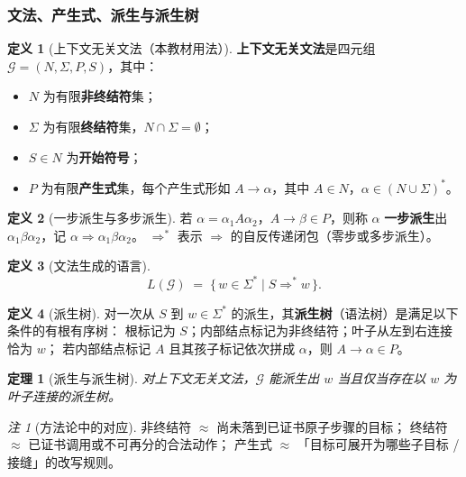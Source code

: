 \documentclass[UTF8,a4paper,11pt]{ctexart}
\theoremstyle{definition}
\newtheorem{definition}{定义}[section]
\theoremstyle{plain}
\newtheorem{theorem}{定理}[section]
\theoremstyle{remark}
\newtheorem{remark}{注}[section]
\numberwithin{figure}{section}
\numberwithin{table}{section}
\begin{document}
\subsubsection{文法、产生式、派生与派生树}
\label{sec:grammar}

\begin{definition}[上下文无关文法（本教材用法）]
\textbf{上下文无关文法}是四元组 $\mathcal{G}=(N,\Sigma,P,S)$，其中：
\begin{itemize}
  \item $N$ 为有限\textbf{非终结符}集；
  \item $\Sigma$ 为有限\textbf{终结符}集，$N\cap\Sigma=\emptyset$；
  \item $S\in N$ 为\textbf{开始符号}；
  \item $P$ 为有限\textbf{产生式}集，每个产生式形如 $A\to\alpha$，其中 $A\in N$，$\alpha\in(N\cup\Sigma)^*$。
\end{itemize}
\end{definition}

\begin{definition}[一步派生与多步派生]
若 $\alpha=\alpha_1 A \alpha_2$，$A\to\beta\in P$，则称 $\alpha$ \textbf{一步派生}出 $\alpha_1\beta\alpha_2$，记 $\alpha\Rightarrow\alpha_1\beta\alpha_2$。
$\Rightarrow^*$ 表示 $\Rightarrow$ 的自反传递闭包（零步或多步派生）。
\end{definition}

\begin{definition}[文法生成的语言]
\[
L(\mathcal{G}) \;=\; \{\,w\in\Sigma^*\mid S\Rightarrow^* w\,\}.
\]
\end{definition}

\begin{definition}[派生树]
对一次从 $S$ 到 $w\in\Sigma^*$ 的派生，其\textbf{派生树}（语法树）是满足以下条件的有根有序树：
根标记为 $S$；内部结点标记为非终结符；叶子从左到右连接恰为 $w$；
若内部结点标记 $A$ 且其孩子标记依次拼成 $\alpha$，则 $A\to\alpha\in P$。
\end{definition}

\begin{theorem}[派生与派生树]
对上下文无关文法，$\mathcal{G}$ 能派生出 $w$ 当且仅当存在以 $w$ 为叶子连接的派生树。
\end{theorem}

\begin{remark}[方法论中的对应]
非终结符 $\approx$ 尚未落到已证书原子步骤的目标；
终结符 $\approx$ 已证书调用或不可再分的合法动作；
产生式 $\approx$ 「目标可展开为哪些子目标 / 接缝」的改写规则。
\end{remark}
\end{document}
